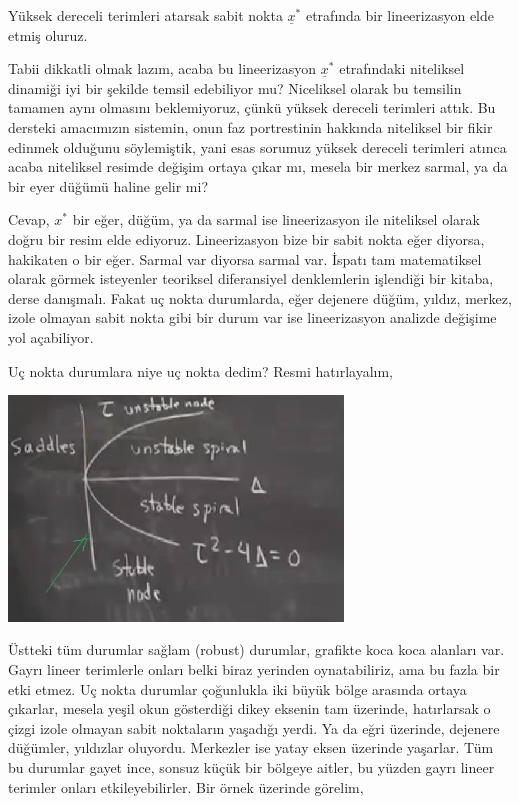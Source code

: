 \documentclass[12pt,fleqn]{article}\usepackage{../../common}
\begin{document}
Yüksek dereceli terimleri atarsak sabit nokta $\underline{x}^*$ etrafında bir
lineerizasyon elde etmiş oluruz.

Tabii dikkatli olmak lazım, acaba bu lineerizasyon $\underline{x}^*$ etrafındaki
niteliksel dinamiği iyi bir şekilde temsil edebiliyor mu? Niceliksel olarak bu
temsilin tamamen aynı olmasını beklemiyoruz, çünkü yüksek dereceli terimleri
attık. Bu dersteki amacımızın sistemin, onun faz portrestinin hakkında
niteliksel bir fikir edinmek olduğunu söylemiştik, yani esas sorumuz yüksek
dereceli terimleri atınca acaba niteliksel resimde değişim ortaya çıkar mı,
mesela bir merkez sarmal, ya da bir eyer düğümü haline gelir mi?

Cevap, $x^*$ bir eğer, düğüm, ya da sarmal ise lineerizasyon ile niteliksel
olarak doğru bir resim elde ediyoruz. Lineerizasyon bize bir sabit nokta eğer
diyorsa, hakikaten o bir eğer. Sarmal var diyorsa sarmal var. İspatı tam
matematiksel olarak görmek isteyenler teoriksel diferansiyel denklemlerin
işlendiği bir kitaba, derse danışmalı. Fakat uç nokta durumlarda, eğer dejenere
düğüm, yıldız, merkez, izole olmayan sabit nokta gibi bir durum var ise
lineerizasyon analizde değişime yol açabiliyor.

Uç nokta durumlara niye uç nokta dedim? Resmi hatırlayalım,

\includegraphics[height=6cm]{06_01.png}

Üstteki tüm durumlar sağlam (robust) durumlar, grafikte koca koca alanları
var. Gayrı lineer terimlerle onları belki biraz yerinden oynatabiliriz, ama bu
fazla bir etki etmez. Uç nokta durumlar çoğunlukla iki büyük bölge arasında
ortaya çıkarlar, mesela yeşil okun gösterdiği dikey eksenin tam üzerinde,
hatırlarsak o çizgi izole olmayan sabit noktaların yaşadığı yerdi. Ya da eğri
üzerinde, dejenere düğümler, yıldızlar oluyordu. Merkezler ise yatay eksen
üzerinde yaşarlar. Tüm bu durumlar gayet ince, sonsuz küçük bir bölgeye aitler,
bu yüzden gayrı lineer terimler onları etkileyebilirler. Bir örnek üzerinde
görelim,
\end{document}
